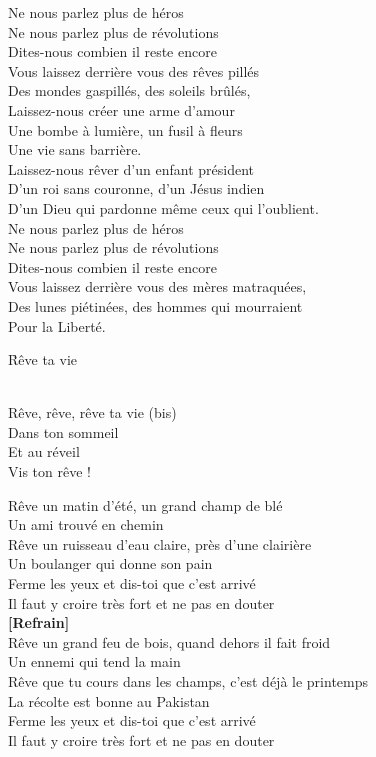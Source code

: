\documentclass{novel}
\begin{document}
Ne nous parlez plus de héros \\
Ne nous parlez plus de révolutions \\
Dites-nous combien il reste encore \\
Vous laissez derrière vous des rêves pillés \\
Des mondes gaspillés, des soleils brûlés, \\
Laissez-nous créer une arme d’amour \\
Une bombe à lumière, un fusil à fleurs \\
Une vie sans barrière. \\
Laissez-nous rêver d’un enfant président \\
D’un roi sans couronne, d’un Jésus indien \\
D’un Dieu qui pardonne même ceux qui l’oublient. \\
Ne nous parlez plus de héros \\
Ne nous parlez plus de révolutions \\
Dites-nous combien il reste encore \\
Vous laissez derrière vous des mères matraquées, \\
Des lunes piétinées, des hommes qui mourraient \\
Pour la Liberté.

\newpage
\large

\h*{Rêve ta vie}

\begin{bfseries}
[Refrain:]\\
Rêve, rêve, rêve ta vie (bis) \\
Dans ton sommeil \\
Et au réveil \\
Vis ton rêve ! \\
\end{bfseries}

Rêve un matin d'été, un grand champ de blé \\
Un ami trouvé en chemin \\
Rêve un ruisseau d'eau claire, près d'une clairière \\
Un boulanger qui donne son pain \\
Ferme les yeux et dis-toi que c'est arrivé \\
Il faut y croire très fort et ne pas en douter \\

\textbf{[Refrain]} \\

Rêve un grand feu de bois, quand dehors il fait froid \\
Un ennemi qui tend la main \\
Rêve que tu cours dans les champs, c'est déjà le printemps \\
La récolte est bonne au Pakistan \\
Ferme les yeux et dis-toi que c'est arrivé \\
Il faut y croire très fort et ne pas en douter
\end{document}
